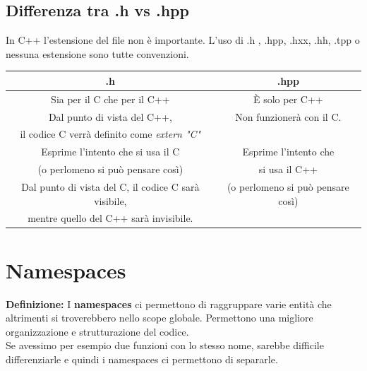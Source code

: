 \subsection{Differenza tra .h vs .hpp}

\textsf{\small In C++ l'estensione del file non è importante. L'uso di .h , .hpp, .hxx, .hh, .tpp o nessuna estensione sono tutte convenzioni.} \\

\begin{tabular}{|c|c|}
	\hline
	\textbf{.h} & \textbf{.hpp} \\
	\hline
	\textsf{\small Sia per il C che per il C++} & \textsf{\small È solo per C++} \\
	\textsf{\small Dal punto di vista del C++, } & \textsf{\small Non funzionerà con il C.} \\
	\textsf{\small il codice C verrà definito come \emph{extern "C"}} & \textsf{\small } \\
	\textsf{\small Esprime l'intento che si usa il C } & \textsf{\small Esprime l'intento che } \\
	\textsf{\small (o perlomeno si può pensare così)} & \textsf{\small si usa il C++ } \\
	\textsf{\small Dal punto di vista del C, il codice C sarà visibile, } & \textsf{\small (o perlomeno si può pensare così)} \\
	\textsf{\small mentre quello del C++ sarà invisibile.} & \textsf{\small } \\
	\hline
\end{tabular}



\newpage

\section{Namespaces}

\textsf{\small \textbf{Definizione: } I \textbf{namespaces} ci permettono di raggruppare varie entità che altrimenti si troverebbero nello scope globale. Permettono una migliore organizzazione e strutturazione del codice.} \\

\textsf{\small Se avessimo per esempio due funzioni con lo stesso nome, sarebbe difficile differenziarle e quindi i namespaces ci permettono di separarle.}


